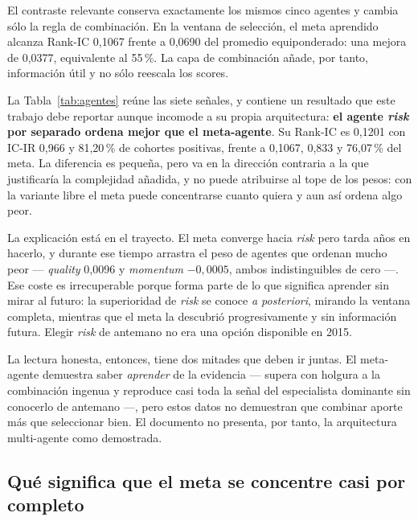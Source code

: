 El contraste relevante conserva exactamente los mismos cinco agentes y cambia sólo la regla de
combinación. En la ventana de selección, el meta aprendido alcanza Rank-IC 0,1067 frente a 0,0690
del promedio equiponderado: una mejora de 0,0377, equivalente al 55\,\%. La capa de combinación
añade, por tanto, información útil y no sólo reescala los scores.

\begin{table}[H]
  \centering
  \caption{Capacidad predictiva de los agentes y combinadores en 2015--2024.}
  \label{tab:agentes}
  
  \caption*{Desviación e IC-IR se calculan sobre cohortes cerradas de la ventana de selección.}
\end{table}

La Tabla~\ref{tab:agentes} reúne las siete señales, y contiene un resultado que este trabajo debe
reportar aunque incomode a su propia arquitectura: \textbf{el agente \textit{risk} por separado
ordena mejor que el meta-agente}. Su Rank-IC es 0,1201 con IC-IR 0,966 y 81,20\,\% de cohortes positivas, frente a 0,1067, 0,833 y
76,07\,\% del meta. La diferencia es pequeña, pero va en la dirección contraria a la que
justificaría la complejidad añadida, y no puede atribuirse al tope de los pesos: con la variante
libre el meta puede concentrarse cuanto quiera y aun así ordena algo peor.

La explicación está en el trayecto. El meta converge hacia \textit{risk} pero tarda años en hacerlo,
y durante ese tiempo arrastra el peso de agentes que ordenan mucho peor --- \textit{quality} 0,0096
y \textit{momentum} $-0{,}0005$, ambos indistinguibles de cero ---. Ese coste es irrecuperable porque
forma parte de lo que significa aprender sin mirar al futuro: la superioridad de \textit{risk} se
conoce \emph{a posteriori}, mirando la ventana completa, mientras que el meta la descubrió
progresivamente y sin información futura. Elegir \textit{risk} de antemano no era una opción
disponible en 2015.

La lectura honesta, entonces, tiene dos mitades que deben ir juntas. El meta-agente demuestra saber
\emph{aprender} de la evidencia --- supera con holgura a la combinación ingenua y reproduce casi
toda la señal del especialista dominante sin conocerlo de antemano ---, pero estos datos no
demuestran que combinar aporte más que seleccionar bien. El documento no presenta, por tanto, la
arquitectura multi-agente como demostrada.

\subsection*{Qué significa que el meta se concentre casi por completo}


